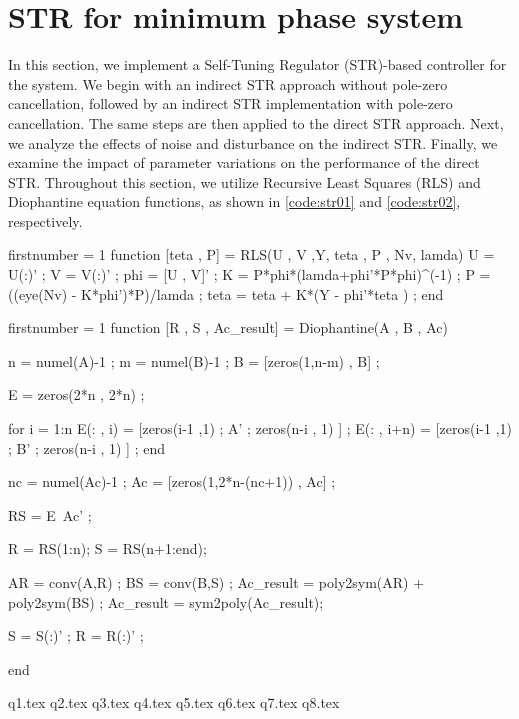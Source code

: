\FloatBarrier
\section{STR for minimum phase system}
In this section, we implement a Self-Tuning Regulator (STR)-based controller for the system. We begin with an indirect STR approach without pole-zero cancellation, followed by an indirect STR implementation with pole-zero cancellation. The same steps are then applied to the direct STR approach. Next, we analyze the effects of noise and disturbance on the indirect STR. Finally, we examine the impact of parameter variations on the performance of the direct STR. Throughout this section, we utilize Recursive Least Squares (RLS) and Diophantine equation functions, as shown in \autoref{code:str01} and \autoref{code:str02}, respectively.

\begin{code}
	\begin{matlabcode}{firstnumber = 1}
function [teta , P] = RLS(U , V ,Y, teta , P , Nv, lamda)
	U = U(:)' ;
	V = V(:)' ;
	phi = [U , V]' ;
	K = P*phi*(lamda+phi'*P*phi)^(-1) ;
	P = ((eye(Nv) - K*phi')*P)/lamda ;
	teta = teta + K*(Y - phi'*teta ) ;
end
	\end{matlabcode}
	\label{code:str01}
\end{code}


\begin{code}
	\begin{matlabcode}{firstnumber = 1}
function [R , S , Ac_result] = Diophantine(A , B , Ac)

	n = numel(A)-1 ; %
	m = numel(B)-1 ; %
	B = [zeros(1,n-m) , B] ;
	
	E = zeros(2*n , 2*n) ;
	
	for i = 1:n
	E(: , i) = [zeros(i-1 ,1) ; A' ; zeros(n-i , 1) ] ;  
	E(: , i+n) = [zeros(i-1 ,1) ; B' ; zeros(n-i , 1) ] ;  
	end
	
	nc = numel(Ac)-1 ;
	Ac = [zeros(1,2*n-(nc+1)) , Ac] ;
	
	RS = E\ Ac' ;
	
	R = RS(1:n); 
	S = RS(n+1:end); 
	
	AR = conv(A,R) ;
	BS = conv(B,S) ;
	Ac_result = poly2sym(AR) + poly2sym(BS) ;
	Ac_result = sym2poly(Ac_result);
	
	S = S(:)' ;
	R = R(:)' ;

end
	\end{matlabcode}
	\label{code:str02}
\end{code}

{q1.tex}
{q2.tex}
{q3.tex}
{q4.tex}
{q5.tex}
{q6.tex}
{q7.tex}
{q8.tex}